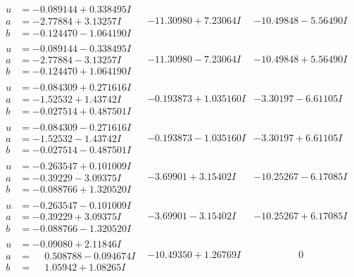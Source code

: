 \documentclass[1p]{elsarticle_modified}
\theoremstyle{definition}
\begin{document}
$$\begin{array}{c|c|c}
\begin{aligned}
u &= -0.089144 + 0.338495 I \\
a &= -2.77884 + 3.13257 I \\
b &= -0.124470 - 1.064190 I\end{aligned}
 & -11.30980 + 7.23064 I & -10.49848 - 5.56490 I \\ \hline\begin{aligned}
u &= -0.089144 - 0.338495 I \\
a &= -2.77884 - 3.13257 I \\
b &= -0.124470 + 1.064190 I\end{aligned}
 & -11.30980 - 7.23064 I & -10.49848 + 5.56490 I \\ \hline\begin{aligned}
u &= -0.084309 + 0.271616 I \\
a &= -1.52532 + 1.43742 I \\
b &= -0.027514 + 0.487501 I\end{aligned}
 & -0.193873 + 1.035160 I & -3.30197 - 6.61105 I \\ \hline\begin{aligned}
u &= -0.084309 - 0.271616 I \\
a &= -1.52532 - 1.43742 I \\
b &= -0.027514 - 0.487501 I\end{aligned}
 & -0.193873 - 1.035160 I & -3.30197 + 6.61105 I \\ \hline\begin{aligned}
u &= -0.263547 + 0.101009 I \\
a &= -0.39229 - 3.09375 I \\
b &= -0.088766 + 1.320520 I\end{aligned}
 & -3.69901 + 3.15402 I & -10.25267 - 6.17085 I \\ \hline\begin{aligned}
u &= -0.263547 - 0.101009 I \\
a &= -0.39229 + 3.09375 I \\
b &= -0.088766 - 1.320520 I\end{aligned}
 & -3.69901 - 3.15402 I & -10.25267 + 6.17085 I \\ \hline\begin{aligned}
u &= -0.09080 + 2.11846 I \\
a &= \phantom{-}0.508788 - 0.094674 I \\
b &= \phantom{-}1.05942 + 1.08265 I\end{aligned}
 & -10.49350 + 1.26769 I & \phantom{-0.000000 } 0 \\ \hline\begin{aligned}

\end{aligned}
\end{array}$$
\end{document}
